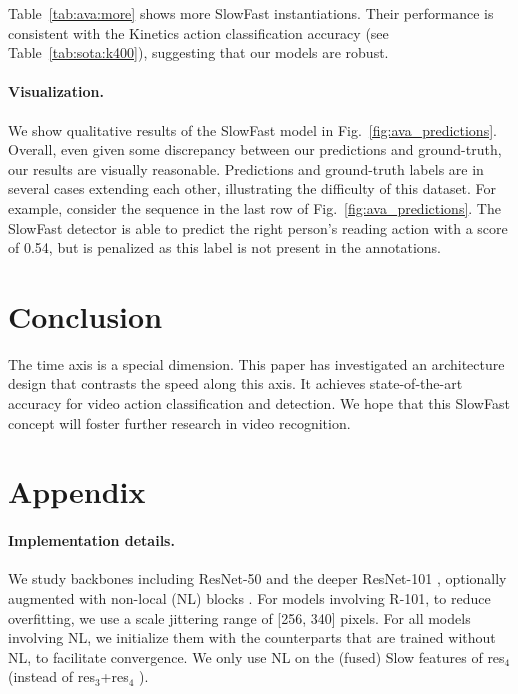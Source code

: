 \documentclass[10pt,twocolumn,letterpaper]{article}
\newcommand{\figref}[1]{Fig.~\ref{#1}}
\newcommand{\tblref}[1]{Table~\ref{#1}}
\begin{document}
	
	\tblref{tab:ava:more} shows more SlowFast instantiations. Their performance is consistent with the Kinetics action classification accuracy (see \tblref{tab:sota:k400}), suggesting that our models are robust.
	
	
	\paragraph{Visualization.} 
	We show qualitative results of the SlowFast model in \figref{fig:ava_predictions}.
	Overall, even given some discrepancy between our predictions and ground-truth, our results are visually reasonable. Predictions and ground-truth labels are in several cases extending each other, illustrating the difficulty of this dataset. For example, consider the sequence in the last row of \figref{fig:ava_predictions}. The SlowFast detector is able to predict the right person's reading action with a score of 0.54, but is penalized as this label is not present in the annotations. 
	
	\section{Conclusion}
	
	The time axis is a special dimension.
	This paper has investigated an architecture design that contrasts the speed along this axis. It achieves state-of-the-art accuracy for video action classification and detection. 
	We hope that this SlowFast concept will foster further research in video recognition.

	\appendix
	\section{Appendix} \label{sec:appendix}
\vspace{-.3em}
\paragraph{Implementation details.}
	We study backbones including ResNet-50 and the deeper ResNet-101 \cite{He2016}, optionally augmented with non-local (NL) blocks \cite{Wang2018}. For models involving R-101, to reduce overfitting, we use a scale jittering range of [256, 340] pixels. For all models involving NL, we initialize them with the counterparts that are trained without NL, to facilitate convergence. We only use NL on the (fused) Slow features of res$_4$ (instead of res$_3$+res$_4$ \cite{Wang2018}). 
\end{document}
